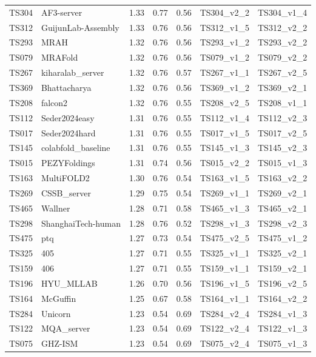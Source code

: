 \begin{longtable}{lllllll}
TS304 & AF3-server & 1.33 & 0.77 & 0.56 & TS304\_v2\_2 & TS304\_v1\_4 \\ 
TS312 & GuijunLab-Assembly & 1.33 & 0.76 & 0.56 & TS312\_v1\_5 & TS312\_v2\_2 \\ 
TS293 & MRAH & 1.32 & 0.76 & 0.56 & TS293\_v1\_2 & TS293\_v2\_2 \\ 
TS079 & MRAFold & 1.32 & 0.76 & 0.56 & TS079\_v1\_2 & TS079\_v2\_2 \\ 
TS267 & kiharalab\_server & 1.32 & 0.76 & 0.57 & TS267\_v1\_1 & TS267\_v2\_5 \\ 
TS369 & Bhattacharya & 1.32 & 0.76 & 0.56 & TS369\_v1\_2 & TS369\_v2\_1 \\ 
TS208 & falcon2 & 1.32 & 0.76 & 0.55 & TS208\_v2\_5 & TS208\_v1\_1 \\ 
TS112 & Seder2024easy & 1.31 & 0.76 & 0.55 & TS112\_v1\_4 & TS112\_v2\_3 \\ 
TS017 & Seder2024hard & 1.31 & 0.76 & 0.55 & TS017\_v1\_5 & TS017\_v2\_5 \\ 
TS145 & colabfold\_baseline & 1.31 & 0.76 & 0.55 & TS145\_v1\_3 & TS145\_v2\_3 \\ 
TS015 & PEZYFoldings & 1.31 & 0.74 & 0.56 & TS015\_v2\_2 & TS015\_v1\_3 \\ 
TS163 & MultiFOLD2 & 1.30 & 0.76 & 0.54 & TS163\_v1\_5 & TS163\_v2\_2 \\ 
TS269 & CSSB\_server & 1.29 & 0.75 & 0.54 & TS269\_v1\_1 & TS269\_v2\_1 \\ 
TS465 & Wallner & 1.28 & 0.71 & 0.58 & TS465\_v1\_3 & TS465\_v2\_1 \\ 
TS298 & ShanghaiTech-human & 1.28 & 0.76 & 0.52 & TS298\_v1\_3 & TS298\_v2\_3 \\ 
TS475 & ptq & 1.27 & 0.73 & 0.54 & TS475\_v2\_5 & TS475\_v1\_2 \\ 
TS325 & 405 & 1.27 & 0.71 & 0.55 & TS325\_v1\_1 & TS325\_v2\_1 \\ 
TS159 & 406 & 1.27 & 0.71 & 0.55 & TS159\_v1\_1 & TS159\_v2\_1 \\ 
TS196 & HYU\_MLLAB & 1.26 & 0.70 & 0.56 & TS196\_v1\_5 & TS196\_v2\_5 \\ 
TS164 & McGuffin & 1.25 & 0.67 & 0.58 & TS164\_v1\_1 & TS164\_v2\_2 \\ 
TS284 & Unicorn & 1.23 & 0.54 & 0.69 & TS284\_v2\_4 & TS284\_v1\_3 \\ 
TS122 & MQA\_server & 1.23 & 0.54 & 0.69 & TS122\_v2\_4 & TS122\_v1\_3 \\ 
TS075 & GHZ-ISM & 1.23 & 0.54 & 0.69 & TS075\_v2\_4 & TS075\_v1\_3 \\ 

\end{longtable}
